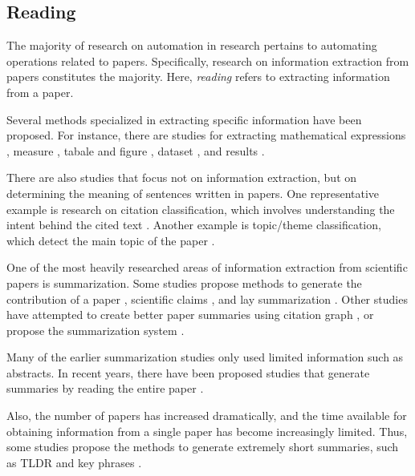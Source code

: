 \documentclass{book}
\begin{document}
\subsection{Reading}
The majority of research on automation in research pertains to automating operations related to papers. Specifically, research on information extraction from papers constitutes the majority. Here, \textit{reading} refers to extracting information from a paper.

Several methods specialized in extracting specific information have been proposed. For instance, there are studies for extracting mathematical expressions \cite{greiner2020math,madisetty2021neural}, measure \cite{harper2021semeval,kohler2021s}, tabale and figure \cite{shen2022vila,hashmi2021current,zhuang2022resel,yamamoto2021visual}, dataset \cite{hou2019identification,kumar2021dataquest,prasad2019dataset}, and results \cite{kardas2020axcell}.

There are also studies that focus not on information extraction, but on determining the meaning of sentences written in papers. One representative example is research on citation classification, which involves understanding the intent behind the cited text \cite{pride2019act,kunnath2021meta,kunnath2022dynamic,kunnath2022act2,lauscher2021multicite}. Another example is topic/theme classification, which detect the main topic of the paper \cite{sadat2022hierarchical,mendoza2022benchmark,salatino2022cso}.

One of the most heavily researched areas of information extraction from scientific papers is summarization. Some studies propose methods to generate the contribution of a paper \cite{hayashi2020s}, scientific claims \cite{wright2022generating}, and lay summarization \cite{goldsack2022making}. Other studies have attempted to create better paper summaries using citation graph \cite{chen2022scientific,an2021enhancing}, or propose the summarization system \cite{erera2019summarization}.

Many of the earlier summarization studies only used limited information such as abstracts. In recent years, there have been proposed studies that generate summaries by reading the entire paper \cite{subramanian2019extractive,qi2022sapgraph,dong2020discourse,tretyak2020combination}.

Also, the number of papers has increased dramatically, and the time available for obtaining information from a single paper has become increasingly limited. Thus, some studies propose the methods to generate extremely short summaries, such as TLDR \cite{cachola2020tldr} and key phrases \cite{boudin2021keyphrase,garg2021keyphrase}.
\end{document}
